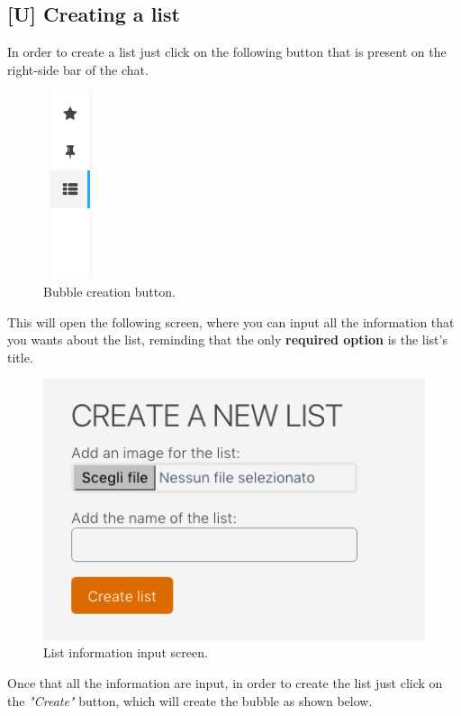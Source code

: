 \newpage
\subsection{[U] Creating a list}
In order to create a list just click on the following button that is present on the right-side bar of the chat.

\begin{figure}[H]
  \centering 
  \includegraphics[scale=1.0]{Sections/3-HowToUse/Images/create_list_button.png}
  \caption{Bubble creation button.}
\end{figure}

This will open the following screen, where you can input all the information that you wants about the list, reminding that the only \textbf{required option} is the list's title.

\begin{figure}[H]
  \centering 
  \includegraphics[scale=0.7]{Sections/3-HowToUse/Images/list_create.png}
  \caption{List information input screen.}
\end{figure}

Once that all the information are input, in order to create the list just click on the \textit{"Create"} button, which will create the bubble as shown below.

